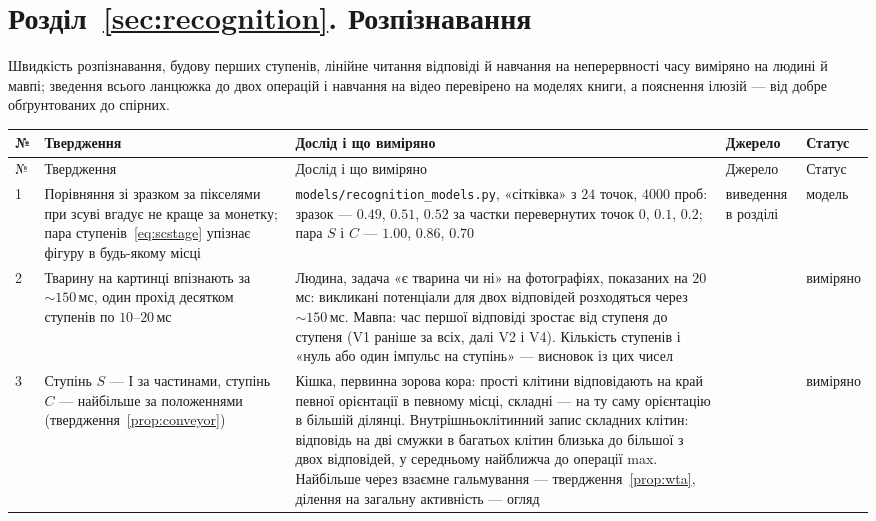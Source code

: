 \section{Розділ~\ref{sec:recognition}. Розпізнавання}

Швидкість розпізнавання, будову перших ступенів, лінійне читання відповіді й навчання на неперервності часу виміряно на людині й мавпі; зведення всього ланцюжка до двох операцій і навчання на відео перевірено на моделях книги, а пояснення ілюзій --- від добре обґрунтованих до спірних.

{\footnotesize
\setlength{\tabcolsep}{3pt}\renewcommand{\arraystretch}{1.15}
\begin{longtable}{>{\raggedright}p{0.5cm}>{\raggedright}p{4.0cm}>{\raggedright}p{5.6cm}>{\raggedright}p{2.3cm}>{\raggedright\arraybackslash}p{1.7cm}}
\toprule
№ & Твердження & Дослід і що виміряно & Джерело & Статус \\
\midrule\endfirsthead
\toprule
№ & Твердження & Дослід і що виміряно & Джерело & Статус \\
\midrule\endhead
1 & Порівняння зі зразком за пікселями при зсуві вгадує не краще за монетку; пара ступенів~\eqref{eq:scstage} упізнає фігуру в будь-якому місці & \texttt{models/\allowbreak recognition\_models.py}, «сітківка» з $24$ точок, $4000$ проб: зразок --- $0.49$, $0.51$, $0.52$ за частки перевернутих точок $0$, $0.1$, $0.2$; пара $S$ і $C$ --- $1.00$, $0.86$, $0.70$ & виведення в розділі & модель \\
2 & Тварину на картинці впізнають за $\sim150$\,мс, один прохід десятком ступенів по $10$--$20$\,мс & Людина, задача «є тварина чи ні» на фотографіях, показаних на $20$\,мс: викликані потенціали для двох відповідей розходяться через $\sim150$\,мс. Мавпа: час першої відповіді зростає від ступеня до ступеня (V1 раніше за всіх, далі V2 і V4). Кількість ступенів і «нуль або один імпульс на ступінь» --- висновок із цих чисел & \cite{Thorpe1996,Schmolesky1998} & виміряно \\
3 & Ступінь $S$ --- І за частинами, ступінь $C$ --- найбільше за положеннями (твердження~\ref{prop:conveyor}) & Кішка, первинна зорова кора: прості клітини відповідають на край певної орієнтації в певному місці, складні --- на ту саму орієнтацію в більшій ділянці. Внутрішньоклітинний запис складних клітин: відповідь на дві смужки в багатьох клітин близька до більшої з двох відповідей, у середньому найближча до операції max. Найбільше через взаємне гальмування --- твердження~\ref{prop:wta}, ділення на загальну активність --- огляд & \cite{HubelWiesel1962,Lampl2004,Carandini2012} & виміряно \\

\end{longtable}}
